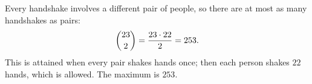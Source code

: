 Every handshake involves a different pair of people, so there are at most as many handshakes as pairs:
\[
\dbinom{23}{2}=\dfrac{23\cdot22}{2}=253 .
\]
This is attained when every pair shakes hands once; then each person shakes $22$ hands, which is allowed. The maximum is $\boxed{253}$.
